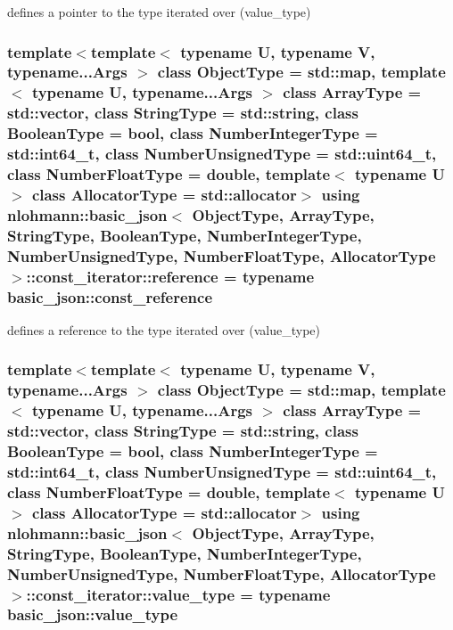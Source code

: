 defines a pointer to the type iterated over (value\+\_\+type) 

\subsubsection[{\texorpdfstring{reference}{reference}}]{\setlength{\rightskip}{0pt plus 5cm}template$<$template$<$ typename U, typename V, typename...\+Args $>$ class Object\+Type = std\+::map, template$<$ typename U, typename...\+Args $>$ class Array\+Type = std\+::vector, class String\+Type  = std\+::string, class Boolean\+Type  = bool, class Number\+Integer\+Type  = std\+::int64\+\_\+t, class Number\+Unsigned\+Type  = std\+::uint64\+\_\+t, class Number\+Float\+Type  = double, template$<$ typename U $>$ class Allocator\+Type = std\+::allocator$>$ using {\bf nlohmann\+::basic\+\_\+json}$<$ Object\+Type, Array\+Type, String\+Type, Boolean\+Type, Number\+Integer\+Type, Number\+Unsigned\+Type, Number\+Float\+Type, Allocator\+Type $>$\+::{\bf const\+\_\+iterator\+::reference} =  typename {\bf basic\+\_\+json\+::const\+\_\+reference}}\hypertarget{classnlohmann_1_1basic__json_1_1const__iterator_aefd248cac6493eed1e6ff53ba6a63eb2}{}\label{classnlohmann_1_1basic__json_1_1const__iterator_aefd248cac6493eed1e6ff53ba6a63eb2}


defines a reference to the type iterated over (value\+\_\+type) 

\subsubsection[{\texorpdfstring{value\+\_\+type}{value_type}}]{\setlength{\rightskip}{0pt plus 5cm}template$<$template$<$ typename U, typename V, typename...\+Args $>$ class Object\+Type = std\+::map, template$<$ typename U, typename...\+Args $>$ class Array\+Type = std\+::vector, class String\+Type  = std\+::string, class Boolean\+Type  = bool, class Number\+Integer\+Type  = std\+::int64\+\_\+t, class Number\+Unsigned\+Type  = std\+::uint64\+\_\+t, class Number\+Float\+Type  = double, template$<$ typename U $>$ class Allocator\+Type = std\+::allocator$>$ using {\bf nlohmann\+::basic\+\_\+json}$<$ Object\+Type, Array\+Type, String\+Type, Boolean\+Type, Number\+Integer\+Type, Number\+Unsigned\+Type, Number\+Float\+Type, Allocator\+Type $>$\+::{\bf const\+\_\+iterator\+::value\+\_\+type} =  typename {\bf basic\+\_\+json\+::value\+\_\+type}}\hypertarget{classnlohmann_1_1basic__json_1_1const__iterator_a9ea0497199b1e96ce9cadd1f202ec343}{}\label{classnlohmann_1_1basic__json_1_1const__iterator_a9ea0497199b1e96ce9cadd1f202ec343}


